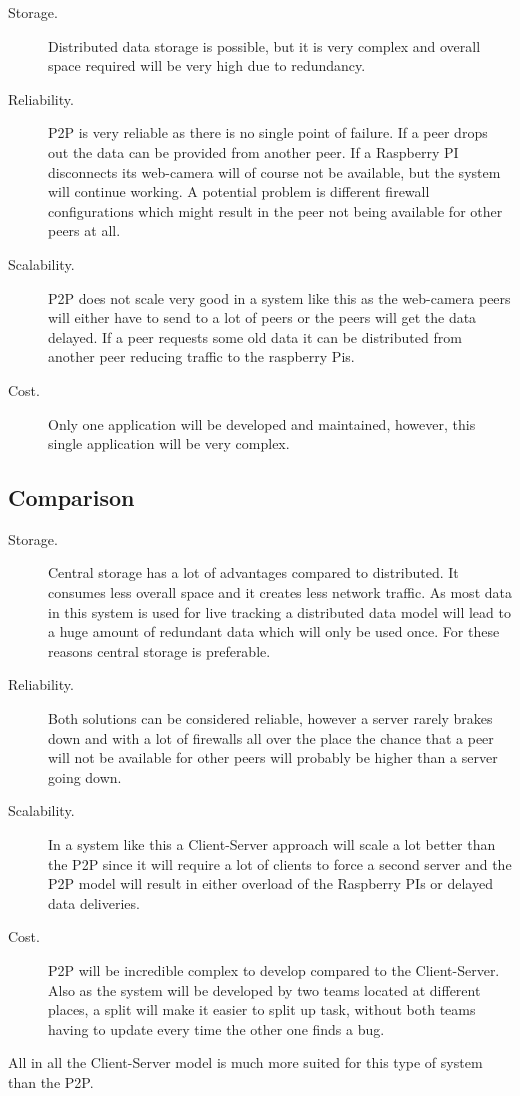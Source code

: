 \begin{description}
\item[Storage.] Distributed data storage is possible, but it is very complex and overall space required will be very high due to redundancy.

\item[Reliability.] P2P is very reliable as there is no single point of failure. If a peer drops out the data can be provided from another peer. If a Raspberry PI disconnects its web-camera will of course not be available, but the system will continue working. A potential problem is different firewall configurations which might result in the peer not being available for other peers at all.

\item[Scalability.] P2P does not scale very good in a system like this as the web-camera peers will either have to send to a lot of peers or the peers will get the data delayed. If a peer requests some old data it can be distributed from another peer reducing traffic to the raspberry Pis.

\item[Cost.] Only one application will be developed and maintained, however, this single application will be very complex.
\end{description}

\subsection{Comparison}
\begin{description}
\item[Storage.] Central storage has a lot of advantages compared to distributed. It consumes less overall space and it creates less network traffic. As most data in this system is used for live tracking a distributed data model will lead to a huge amount of redundant data which will only be used once. For these reasons central storage is preferable.

\item[Reliability.] Both solutions can be considered reliable, however a server rarely brakes down and with a lot of firewalls all over the place the chance that a peer will not be available for other peers will probably be higher than a server going down.

\item[Scalability.] In a system like this a Client-Server approach will scale a lot better than the P2P since it will require a lot of clients to force a second server and the P2P model will result in either overload of the Raspberry PIs or delayed data deliveries.

\item[Cost.] P2P will be incredible complex to develop compared to the Client-Server. Also as the system will be developed by two teams located at different places, a split will make it easier to split up task, without both teams having to update every time the other one finds a bug.

\end{description}

All in all the Client-Server model is much more suited for this type of system than the P2P.